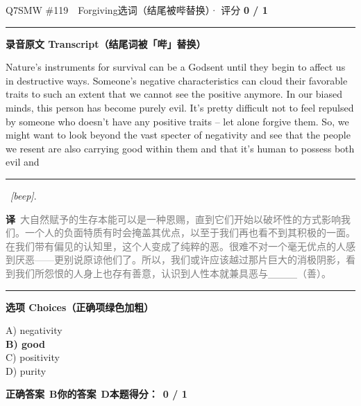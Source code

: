 \documentclass[11pt]{article}
\newcommand{\ptesub}[1]{%
  \par\needspace{2\baselineskip}\smallskip
  {\color{cAccent}\rule[-0.2ex]{3pt}{1.05em}}\hspace{6pt}%
  {\bfseries\color{cHead}#1}\par\nopagebreak\smallskip}
\newcommand{\zh}[1]{{\footnotesize\textcolor{cNote}{\textbf{译}}\ \textcolor{gray}{#1}}}
\begin{document}
\begin{qblock}{Q7\quad SMW \#119\ \ Forgiving}{选词（结尾被哔替换）· 评分 \textcolor{cAccent}{\bfseries 0 / 1}}
\ptesub{录音原文 Transcript（结尾词被「哔」替换）}
\begin{promptbox}
Nature's instruments for survival can be a Godsent until they begin to affect us in destructive ways. Someone's negative characteristics can cloud their favorable traits to such an extent that we cannot see the positive anymore. In our biased minds, this person has become purely evil. It's pretty difficult not to feel repulsed by someone who doesn't have any positive traits -- let alone forgive them. So, we might want to look beyond the vast specter of negativity and see that the people we resent are also carrying good within them and that it's human to possess both evil and \rule[0.3ex]{1.2cm}{0.4pt}\ \textit{[beep]}.
\end{promptbox}
\zh{大自然赋予的生存本能可以是一种恩赐，直到它们开始以破坏性的方式影响我们。一个人的负面特质有时会掩盖其优点，以至于我们再也看不到其积极的一面。在我们带有偏见的认知里，这个人变成了纯粹的恶。很难不对一个毫无优点的人感到厌恶——更别说原谅他们了。所以，我们或许应该越过那片巨大的消极阴影，看到我们所怨恨的人身上也存有善意，认识到人性本就兼具恶与＿＿＿（善）。}
\ptesub{选项 Choices（正确项绿色加粗）}
{\small
A) negativity\\
{\color{cFix}\textbf{B) good}}\\
C) positivity\\
D) purity}
\par\smallskip
\textbf{正确答案}\ \textcolor{cFix}{\bfseries B}\qquad\textbf{你的答案}\ {\color{cWrong}\bfseries D}\qquad\textbf{本题得分：}\ {\color{cAccent}\bfseries 0 / 1}
\end{qblock}
\end{document}

